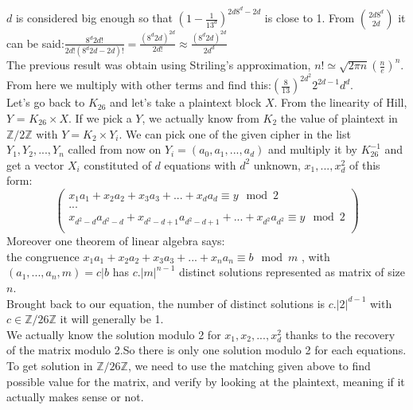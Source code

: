 \documentclass{article}
\begin{document}
$d$ is considered big enough so that $(1-\frac{1}{13^d})^{2d8^d - 2d}$ is close to 1.
From ${2d8^d \choose 2d}$ it can be said:$\frac{8^d 2d!}{2d!(8^d 2d-2d)!} = \frac{(8^d 2d)^{2d}}{2d!} \approx \frac{(8^d 2d)^{2d}}{2d^{d}}$\\
The previous result was obtain using Striling's approximation, $n! \simeq \sqrt{2\pi n}(\frac{n}{e})^n$.\\
From here we multiply with other terms and find this:$(\frac{8}{13})^{2d^2} 2^{2d-1} d^d$.\\
Let's go back to $K_{26}$ and let's take a plaintext block $X$. From the linearity of Hill, $Y$ = $K_{26} \times X$. If we pick a $Y$, we actually know from $K_{2}$ the value of plaintext in $\mathbb{Z}/2\mathbb{Z}$ with $Y = K_2 \times Y_i$. We can pick one of the given cipher in the list $ Y_1 , Y_2 , ... , Y_n$ called from now on $Y_i= (a_0,a_1,...,a_d)$  and multiply it by $K_{26}^{-1}$ and get a vector $X_i$ constituted of $d$ equations with $d^2$ unknown, $x_1, ...,x_d^{2}$ of this form:\\
$$
\begin{pmatrix}
x_1 a_1 + x_2 a_2 + x_3 a_3 + ... + x_{d} a_{d} \equiv y \mod 2 \\
...\\
x_{d^2 - d} a_{d^2 - d} + x_{d^2 - d +1}  a_{d^2 - d+1}  + ... + x_{d^2} a_{d^2} \equiv y \mod 2\\
\end{pmatrix}
$$
Moreover one theorem of linear algebra says:\\
the congruence $x_1 a_1 + x_2 a_2 + x_3 a_3 + ... + x_{n} a_{n} \equiv b \mod m$ , with $(a_1,...,a_n,m) = c|b $ has $ c.|m|^{n-1}$ distinct solutions represented as matrix of size $n$.\\
Brought back to our equation, the number of distinct solutions is $c.|2|^{d-1}$ with $c \in  \mathbb{Z}/26\mathbb{Z}$ it will generally be 1.\\
We actually know the solution modulo 2 for $x_1 ,x_2 ,... , x_d^{2}$ thanks to the recovery of the matrix modulo 2.So there is only one solution modulo 2 for each equations. To get solution in $\mathbb{Z}/26\mathbb{Z}$, we need to use the matching given above to find possible value for the matrix, and verify by looking at the plaintext, meaning if it actually makes sense or not.\\
\end{document}
